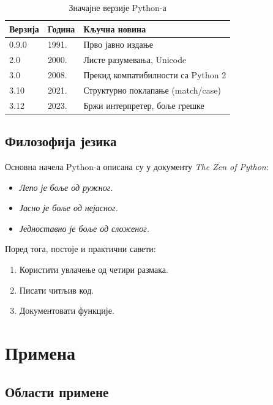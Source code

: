 \documentclass[12pt,a4paper]{article}
\begin{document}
\begin{table}[h!]
\centering
\caption{Значајне верзије Python-а}
\label{tab:verzije}
\begin{tabular}{@{}lll@{}}
\toprule
\textbf{Верзија} & \textbf{Година} & \textbf{Кључна новина} \\
\midrule
0.9.0  & 1991. & Прво јавно издање \\
2.0    & 2000. & Листе разумевања, Unicode \\
3.0    & 2008. & Прекид компатибилности са Python 2 \\
3.10   & 2021. & Структурно поклапање (match/case) \\
3.12   & 2023. & Бржи интерпретер, боље грешке \\
\bottomrule
\end{tabular}
\end{table}

\subsection{Филозофија језика}

Основна начела Python-а описана су у документу \textit{The Zen of Python}:

\begin{itemize}
    \item \textit{Лепо је боље од ружног.}
    \item \textit{Јасно је боље од нејасног.}
    \item \textit{Једноставно је боље од сложеног.}
\end{itemize}

Поред тога, постоје и практични савети:

\begin{enumerate}
    \item Користити увлачење од четири размака.
    \item Писати читљив код.
    \item Документовати функције.
\end{enumerate}

\section{Примена}

\subsection{Области примене}
\end{document}
